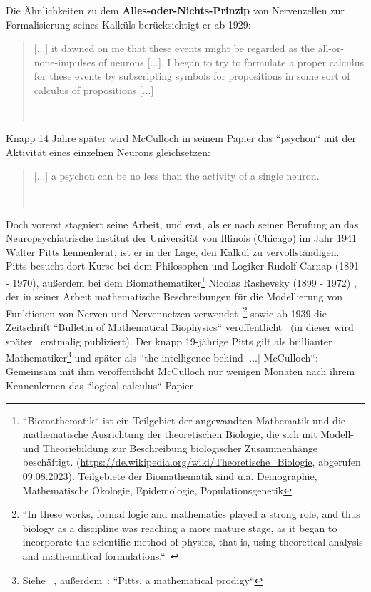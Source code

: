 Die Ähnlichkeiten zu dem \textbf{Alles-oder-Nichts-Prinzip} von Nervenzellen zur Formalisierung seines Kalküls berücksichtigt er ab 1929:

\blockquote[{~\cite[6]{Mcc61}}]{
    [...] it dawned on me that these events might be regarded as the all-or-none-impulses of neurons [...]. I began to try to formulate a proper calculus for these events by subscripting symbols for propositions in some sort of calculus of propositions [...]
}

Knapp 14 Jahre später wird McCulloch in seinem Papier das ``psychon`` mit der Aktivität eines einzelnen Neurons gleichsetzen:

\blockquote[{~\cite[114]{MP43}}]{
    [...] a psychon can be no less than the activity of a single neuron.
}

Doch vorerst stagniert seine Arbeit, und erst, als er nach seiner Berufung an das Neuropsychiatrische Institut der Universität von Illinois (Chicago) im Jahr 1941 Walter Pitts kennenlernt, ist er in der Lage, den Kalkül zu vervollständigen.\\

Pitts besucht dort Kurse bei dem Philosophen und Logiker Rudolf Carnap (1891 - 1970), außerdem bei dem Biomathematiker\footnote{
    ``Biomathematik`` ist ein Teilgebiet der angewandten Mathematik und die mathematische Ausrichtung der theoretischen Biologie, die sich mit Modell- und Theoriebildung zur Beschreibung biologischer Zusammenhänge beschäftigt. ({\url{https://de.wikipedia.org/wiki/Theoretische\_Biologie}}, abgerufen 09.08.2023). Teilgebiete der Biomathematik sind u.a. Demographie, Mathematische Ökologie, Epidemologie, Populationsgenetik
} Nicolas Rashevsky (1899 - 1972) \cite[184]{Pic04}, der in seiner Arbeit mathematische Beschreibungen für die Modellierung von Funktionen von Nerven und Nervennetzen verwendet~\cite[13]{Abr02}\footnote{
    ``In these works, formal logic and mathematics played a strong role, and thus biology as a discipline was reaching a more mature stage, as it began to incorporate the scientific method of physics, that is, using theoretical analysis and mathematical formulations.``~\cite[7]{Abr02}
} sowie ab 1939 die Zeitschrift ``Bulletin of Mathematical Biophysics`` veröffentlicht~\cite[16]{Abr02} (in dieser wird später~\cite{MP43} erstmalig publiziert).
Der knapp 19-jährige Pitts gilt als brillianter Mathematiker\footnote{
    Siehe ~\cite[4]{Arb19}, außerdem~\cite[22]{Abr02}: ``Pitts, a mathematical prodigy``
} und später als ``the intelligence behind [...] McCulloch``: Gemeinsam mit ihm veröffentlicht McCulloch nur wenigen Monaten nach ihrem Kennenlernen das ``logical calculus``-Papier~\cite[104]{AR98}



